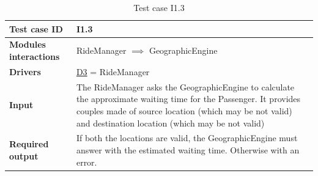 \begin{table}[H]
\begin{tabular}{ l | p{} }
\textbf{Test case ID} & I1.3 \\ \hline
\textbf{Modules interactions} & RideManager $\implies$ GeographicEngine \\ \hline
\textbf{Drivers} &  \hyperref[D3]{D3} = RideManager \\ \hline
\textbf{Input} & The RideManager asks the GeographicEngine to calculate the approximate waiting time for the Passenger. It provides couples made of source location (which may be not valid) and destination location (which may be not valid) \\ \hline
\textbf{Required output} & If both the locations are valid, the GeographicEngine must answer with the estimated waiting time. Otherwise with an error.
\end{tabular}
\caption{Test case I1.3}
\end{table}